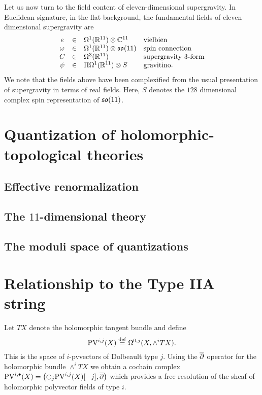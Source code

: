 \documentclass[11pt]{amsart}
\def\pv{{\rm PV}}
\begin{document}
Let us now turn to the field content of eleven-dimensional supergravity.
In Euclidean signature, in the flat background, the fundamental fields of eleven-dimensional supergravity are
\[
  \begin{array}{ccll}
    e & \in & \Omega^1(\mathbb R^{11}) \otimes \mathbb C^{11} & \mbox{vielbien} \\
    \omega & \in & \Omega^1(\mathbb R^{11}) \otimes \mathfrak s \mathfrak o(11) & \mbox{spin connection} \\
    C & \in & \Omega^3(\mathbb R^{11}) & \mbox{supergravity $3$-form} \\
    \psi & \in & \Pi \Omega^1(\mathbb R^{11}) \otimes S & \mbox{gravitino} .
  \end{array}
\]
We note that the fields above have been complexified from the usual presentation of supergravity in terms of real fields.
Here, $S$ denotes the $128$ dimensional complex spin representation of $\mathfrak s \mathfrak o(11)$.

\section{Quantization of holomorphic-topological theories}
\label{sec:org297a559}
\subsection{Effective renormalization}
\label{sec:orga5cd4ed}
\subsection{The \(11\)-dimensional theory}
\label{sec:org8b189fc}
\subsection{The moduli space of quantizations}
\label{sec:orgf278b4e}
\section{Relationship to the Type IIA string}
\label{sec:org355a726}

Let $TX$ denote the holomorphic tangent bundle and define
\[
\pv^{i,j}(X) \define \Omega^{0,j}(X, \wedge^{i} TX) .\]
This is the space of $i$-pvvectors of Dolbeault type $j$.
Using the $\overline{\partial}$ operator for the holomorphic bundle $\wedge^{i}TX$ we obtain a cochain complex $\pv^{i,\bu}(X) = \left(\oplus_{j} \pv^{i,j}(X) [-j], \dbar \right)$ which provides a free resolution of the sheaf of holomorphic polyvector fields of type $i$.
\end{document}
